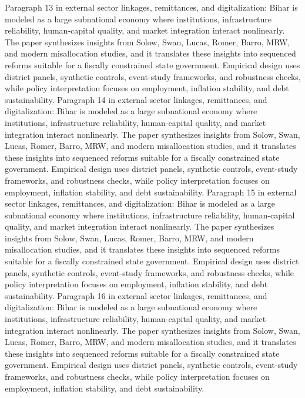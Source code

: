 \documentclass[preprint,12pt]{elsarticle}
\begin{document}
Paragraph 13 in external sector linkages, remittances, and digitalization: Bihar is modeled as a large subnational economy where institutions, infrastructure reliability, human-capital quality, and market integration interact nonlinearly. The paper synthesizes insights from Solow, Swan, Lucas, Romer, Barro, MRW, and modern misallocation studies, and it translates these insights into sequenced reforms suitable for a fiscally constrained state government. Empirical design uses district panels, synthetic controls, event-study frameworks, and robustness checks, while policy interpretation focuses on employment, inflation stability, and debt sustainability.
Paragraph 14 in external sector linkages, remittances, and digitalization: Bihar is modeled as a large subnational economy where institutions, infrastructure reliability, human-capital quality, and market integration interact nonlinearly. The paper synthesizes insights from Solow, Swan, Lucas, Romer, Barro, MRW, and modern misallocation studies, and it translates these insights into sequenced reforms suitable for a fiscally constrained state government. Empirical design uses district panels, synthetic controls, event-study frameworks, and robustness checks, while policy interpretation focuses on employment, inflation stability, and debt sustainability.
Paragraph 15 in external sector linkages, remittances, and digitalization: Bihar is modeled as a large subnational economy where institutions, infrastructure reliability, human-capital quality, and market integration interact nonlinearly. The paper synthesizes insights from Solow, Swan, Lucas, Romer, Barro, MRW, and modern misallocation studies, and it translates these insights into sequenced reforms suitable for a fiscally constrained state government. Empirical design uses district panels, synthetic controls, event-study frameworks, and robustness checks, while policy interpretation focuses on employment, inflation stability, and debt sustainability.
Paragraph 16 in external sector linkages, remittances, and digitalization: Bihar is modeled as a large subnational economy where institutions, infrastructure reliability, human-capital quality, and market integration interact nonlinearly. The paper synthesizes insights from Solow, Swan, Lucas, Romer, Barro, MRW, and modern misallocation studies, and it translates these insights into sequenced reforms suitable for a fiscally constrained state government. Empirical design uses district panels, synthetic controls, event-study frameworks, and robustness checks, while policy interpretation focuses on employment, inflation stability, and debt sustainability.
\end{document}
